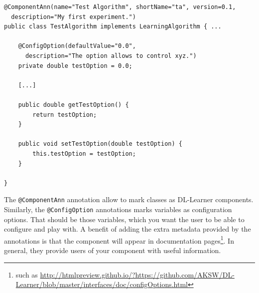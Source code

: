 \documentclass[a4paper,12pt]{scrartcl}
\begin{document}
\begin{verbatim}
@ComponentAnn(name="Test Algorithm", shortName="ta", version=0.1, 
  description="My first experiment.")
public class TestAlgorithm implements LearningAlgorithm { ...

    @ConfigOption(defaultValue="0.0",
      description="The option allows to control xyz.")
    private double testOption = 0.0;

    [...]

    public double getTestOption() {
        return testOption;
    }

    public void setTestOption(double testOption) {
        this.testOption = testOption;
    }

}
\end{verbatim}

The \verb|@ComponentAnn| annotation allow to mark classes as DL-Learner components. Similarly, the \verb|@ConfigOption| annotations marks variables as configuration options. That should be those variables, which you want the user to be able to configure and play with. A benefit of adding the extra metadata provided by the annotations is that the component will appear in documentation pages\footnote{such as \url{http://htmlpreview.github.io/?https://github.com/AKSW/DL-Learner/blob/master/interfaces/doc/configOptions.html}}. In general, they provide users of your component with useful information.
\end{document}
